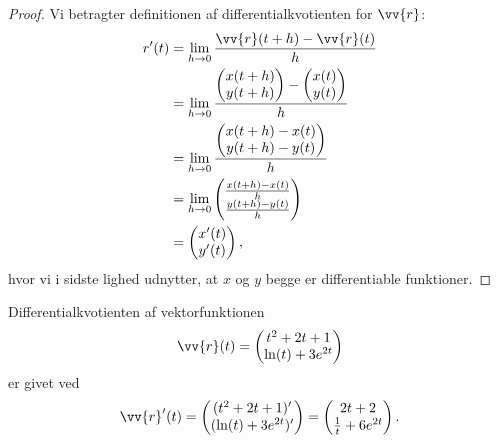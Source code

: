 \begin{proof}
	Vi betragter definitionen af differentialkvotienten for $\vv{r}$:
	\begin{align*}
		r'(t) &= \lim_{h\to 0}\frac{\vv{r}(t+h)-\vv{r}(t)}{h}\\
		&= \lim_{h\to 0 }
		\frac{
		\begin{pmatrix}
			x(t+h) \\
			y(t+h)
		\end{pmatrix} -
		\begin{pmatrix}
			x(t) \\
			y(t)
		\end{pmatrix}
		}{	
		h
		} \\
		&=
		\lim_{h\to 0 }
		\frac{
		\begin{pmatrix}
			x(t+h)-x(t) \\
			y(t+h)-y(t)
		\end{pmatrix}
		}{
		h
		}
		\\
		&=
		\lim_{h\to 0}
		\begin{pmatrix}
			\frac{x(t+h)-x(t)}{h} \\
			\frac{y(t+h)-y(t)}{h}
		\end{pmatrix} \\
		&=
		\begin{pmatrix}
			x'(t) \\
			y'(t)
		\end{pmatrix},
	\end{align*}
	hvor vi i sidste lighed udnytter, at $x$ og $y$ begge er differentiable funktioner.
\end{proof}

\begin{exa}
	Differentialkvotienten af vektorfunktionen
	\begin{align*}
		\vv{r}(t) = 
		\begin{pmatrix}
			t^2+2t+1 \\
			\ln(t) + 3e^{2t}
		\end{pmatrix}
	\end{align*}
	er givet ved
	\begin{align*}
		\vv{r}'(t) = 
		\begin{pmatrix}
			(t^2+2t+1)' \\
			(\ln(t) + 3e^{2t})'
		\end{pmatrix} =
		\begin{pmatrix}
			2t+2 \\
			\frac{1}{t} + 6e^{2t}
		\end{pmatrix}.
	\end{align*}
\end{exa}

